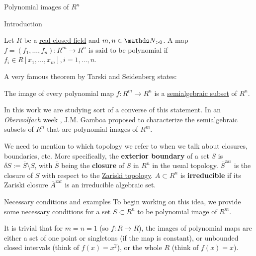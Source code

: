 \documentclass[11pt, a4paper, english, twoside, notitlepage]{report}
\begin{document}
\begin{chapter}{Polynomial images of $R^n$}

\begin{section}{Introduction}
	\begin{definition}\label{polyMap}
	Let $R$ be a \hyperref[realCField]{real closed field} and $m, n \in \N_{>0}$. A map $f = (f_1, \dots, f_n): R^m \longrightarrow R^n$ is said to be polynomial if $f_i \in R[x_1, \dots, x_m], i = 1,\dots, n$. 
	\end{definition}
	
	A very famous theorem by Tarski and Seidenberg states:
	\begin{theorem}\label{tarskiSeidenberg}
	The image of every polynomial map $f: R^m \longrightarrow R^n$ is a \hyperref[semialgSet]{semialgebraic subset} of $R^n$.
	\end{theorem}
	
	In this work we are studying sort of a converse of this statement. In an \emph{Oberwolfach} week \cite{g}, J.M. Gamboa proposed to characterize the semialgebraic subsets of $R^n$ that are polynomial images of $R^m$.
	
	
	\begin{notation}
	We need to mention to which topology we refer to when we talk about closures, boundaries, etc. More specifically, the \textbf{exterior boundary} of a set $S$ is $\delta S := \overline{S} \setminus S$, with $\overline{S}$ being the \textbf{closure} of $S$ in $R^n$ in the usual topology. $\overline{S}^{\text{zar}}$ is the closure of $S$ with respect to the \hyperref[zariski]{Zariski topology}. $A\subset R^n$ is \textbf{irreducible} if its Zariski closure $\overline{A}^{\text{zar}}$ is an irreducible algebraic set.
	\end{notation}
	
	\begin{subsection}{Necessary conditions and examples}
	To begin working on this idea, we provide some necessary conditions for a set $S\subset R^n$ to be polynomial image of $R^m$. 
	
	It is trivial that for $m = n = 1$ (so $f: R \rightarrow R$), the images of polynomial maps are either a set of one point or singletons (if the map is constant), or unbounded closed intervals (think of $f(x) = x^2$), or the whole $R$ (think of $f(x) = x$).
	

\end{subsection}
\end{section}
\end{chapter}
\end{document}
